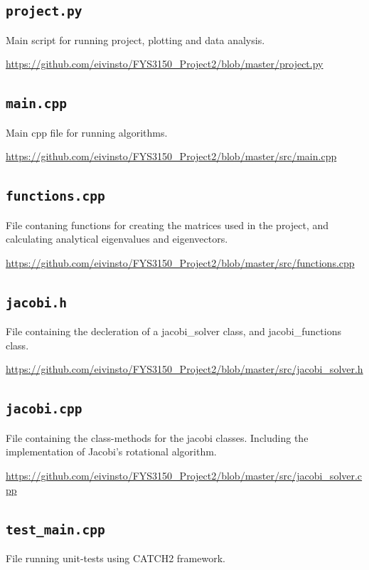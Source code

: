 \documentclass[reprint,english,notitlepage]{revtex4-1}  %
\begin{document}
\cprotect\subsection{\verb+project.py+} \label{A.1}
Main script for running project, plotting and data analysis.

\url{https://github.com/eivinsto/FYS3150_Project2/blob/master/project.py}

\cprotect\subsection{\verb+main.cpp+} \label{A.2}
Main cpp file for running algorithms.

\url{https://github.com/eivinsto/FYS3150_Project2/blob/master/src/main.cpp}

\cprotect\subsection{\verb+functions.cpp+} \label{A.3}
File contaning functions for creating the matrices used in the project, and calculating analytical eigenvalues and eigenvectors.

\url{https://github.com/eivinsto/FYS3150_Project2/blob/master/src/functions.cpp}

\cprotect\subsection{\verb+jacobi.h+} \label{A.4}
File containing the decleration of a jacobi\_solver class, and jacobi\_functions class.

\url{https://github.com/eivinsto/FYS3150_Project2/blob/master/src/jacobi_solver.h}

\cprotect\subsection{\verb+jacobi.cpp+} \label{A.5}
File containing the class-methods for the jacobi classes. Including the implementation of Jacobi's rotational algorithm.

\url{https://github.com/eivinsto/FYS3150_Project2/blob/master/src/jacobi_solver.cpp}

\cprotect\subsection{\verb+test_main.cpp+} \label{A.6}
File running unit-tests using CATCH2 framework.
\end{document}
